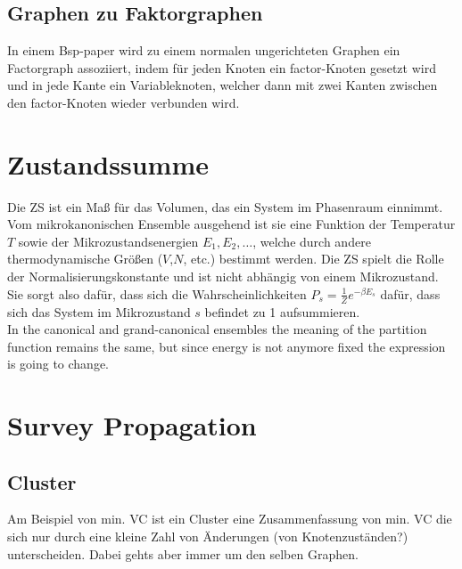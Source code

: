 \documentclass[paper=a4,10pt]{scrartcl}
\begin{document}
\subsection{Graphen zu Faktorgraphen}
In einem Bsp-paper wird zu einem normalen ungerichteten Graphen ein Factorgraph assoziiert, indem für jeden Knoten ein factor-Knoten gesetzt wird und in jede Kante ein Variableknoten, welcher dann mit zwei Kanten zwischen den factor-Knoten wieder verbunden wird. 

\section{Zustandssumme}
Die ZS ist ein Maß für das Volumen, das ein System im Phasenraum einnimmt.
Vom mikrokanonischen Ensemble ausgehend ist sie eine Funktion der Temperatur $T$ sowie der Mikrozustandsenergien $E_1, E_2, \dots$, welche durch andere thermodynamische Größen ($V$,$N$, etc.) bestimmt werden. Die ZS spielt die Rolle der Normalisierungskonstante und ist nicht abhängig von einem Mikrozustand. Sie sorgt also dafür, dass sich die Wahrscheinlichkeiten $P_s = \frac{1}{Z}e^{-\beta E_s}$ dafür, dass sich das System im Mikrozustand $s$ befindet zu 1 aufsummieren. \\
In the canonical and grand-canonical ensembles the meaning of the partition function remains the same, but since energy is not anymore fixed the expression is going to change.

\section{Survey Propagation}
\subsection{Cluster}
Am Beispiel von min. VC ist ein Cluster eine Zusammenfassung von min. VC die sich nur durch eine kleine Zahl von Änderungen (von Knotenzuständen?) unterscheiden. Dabei gehts aber immer um den selben Graphen.
\end{document}
